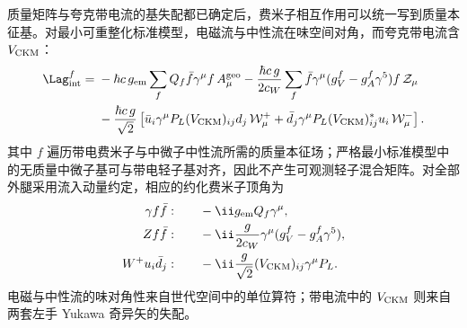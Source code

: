 质量矩阵与夸克带电流的基失配都已确定后，费米子相互作用可以统一写到质量本征基。对最小可重整化标准模型，电磁流与中性流在味空间对角，而夸克带电流含 $V_{\rm CKM}$：
\begin{align}
 \Lag_{\rm int}^{f}
 ={}&-\hbar c\,g_{\rm em}\sum_fQ_f\bar f\gamma^\mu f\,A_\mu^{\rm geo}
 -\frac{\hbar c\,g}{2c_W}\sum_f
 \bar f\gamma^\mu(g_V^f-g_A^f\gamma^5)f\,\mathcal Z_\mu
 \nonumber\\
 &-\frac{\hbar c\,g}{\sqrt2}
 \left[\bar u_i\gamma^\mu P_L(V_{\rm CKM})_{ij}d_j\,\mathcal W_\mu^+
 +\bar d_j\gamma^\mu P_L(V_{\rm CKM})_{ij}^*u_i\,\mathcal W_\mu^-\right].
 \label{eq:sm-mass-basis-fermion-interactions-dp11}
\end{align}
其中 $f$ 遍历带电费米子与中微子中性流所需的质量本征场；严格最小标准模型中的无质量中微子基可与带电轻子基对齐，因此不产生可观测轻子混合矩阵。对全部外腿采用流入动量约定，相应的约化费米子顶角为
\begin{align}
 \gamma f\bar f:&\qquad -\ii g_{\rm em}Q_f\gamma^\mu,\\
 Zf\bar f:&\qquad -\ii\frac{g}{2c_W}\gamma^\mu(g_V^f-g_A^f\gamma^5),\\
 W^+u_i\bar d_j:&\qquad -\ii\frac{g}{\sqrt2}(V_{\rm CKM})_{ij}\gamma^\mu P_L.
 \label{eq:sm-fermion-feynman-rules-dp11}
\end{align}
电磁与中性流的味对角性来自世代空间中的单位算符；带电流中的 $V_{\rm CKM}$ 则来自两套左手 Yukawa 奇异矢的失配。
